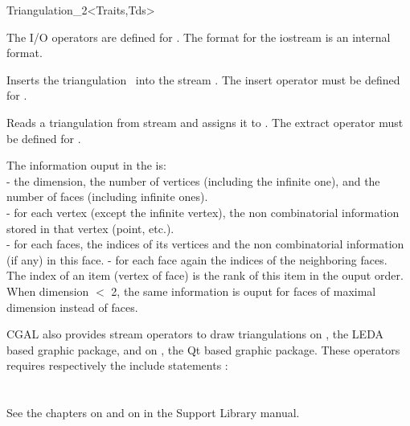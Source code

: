 \begin{ccRefClass}{Triangulation_2<Traits,Tds>}


The I/O operators are defined for .
The format for the iostream
is an internal format. 


{Inserts the triangulation \ccVar\ into the stream .
\ccPrecond The insert operator must be defined for .}

{Reads a triangulation from stream  and assigns it
to \ccVar. \ccPrecond The extract operator must be defined for .}

The information ouput  in the  is: \\
- the dimension, the number of vertices (including the infinite one), 
 and the number of faces (including infinite ones). \\
- for each vertex (except the infinite vertex), 
the non combinatorial information stored in  that vertex
(point, etc.). \\
- for each faces,  the indices of its vertices and 
the non combinatorial information (if any) in  this face.
- for each face again 
 the indices of the neighboring faces. \\
The  index of an item  (vertex of face) is
the rank of this item in the ouput order.
When dimension $<$ 2, the same information is ouput
for faces of maximal dimension instead of faces.



CGAL also provides  stream operators \ccc{ <<}  to draw triangulations
on , the LEDA based graphic package,
and on , the Qt based graphic package.
These operators requires respectively  the include statements : \\
 \\
\\
See the chapters on  and on  in
the Support Library manual.




\end{ccRefClass}
